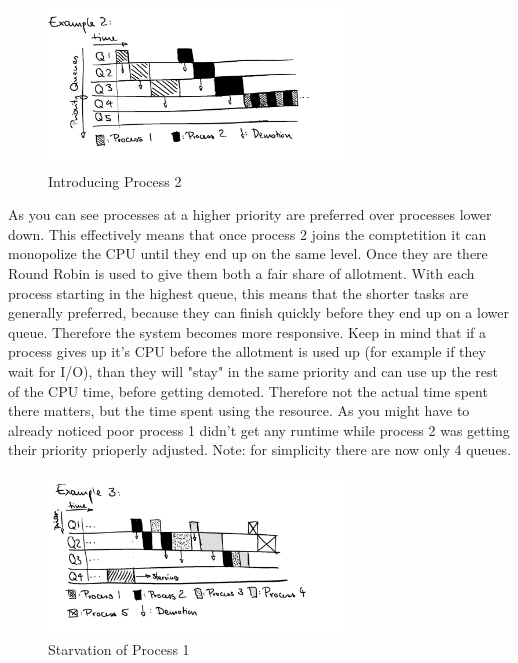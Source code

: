 \documentclass{report}
\begin{document}
\begin{figure}[h]
  \begin{center}
    \includegraphics[width=0.7\textwidth]{assets/mlfq-diag-2.png}
    \caption{Introducing Process 2}
    \label{mlfq-diag-2}
  \end{center}
\end{figure}

As you can see processes at a higher priority are preferred over processes lower down. 
This effectively means that once process 2 joins the comptetition it can monopolize the CPU until they end up on the same level.
Once they are there Round Robin is used to give them both a fair share of allotment.
With each process starting in the highest queue, this means that the shorter tasks are generally preferred, because they can finish quickly before they end up on a lower queue. Therefore the system becomes more responsive.
Keep in mind that if a process gives up it's CPU before the allotment is used up (for example if they wait for I/O), than they will "stay" in the same priority and can use up the rest of the CPU time, before getting demoted.
Therefore not the actual time spent there matters, but the time spent using the resource.
As you might have to already noticed poor process 1 didn't get any runtime while process 2 was getting their priority prioperly adjusted. Note: for simplicity there are now only 4 queues.

\begin{figure}[h]
  \begin{center}
    \includegraphics[width=0.7\textwidth]{assets/mlfq-diag-3.png}
    \caption{Starvation of Process 1}
    \label{mlfq-diag-3}
  \end{center}
\end{figure}
\end{document}
